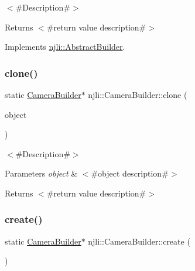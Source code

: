 $<$\#\+Description\#$>$

\begin{DoxyReturn}{Returns}
$<$\#return value description\#$>$ 
\end{DoxyReturn}


Implements \mbox{\hyperlink{classnjli_1_1_abstract_builder_aa1d220053e182c37b31b427499c6eacf}{njli\+::\+Abstract\+Builder}}.

\mbox{\label{classnjli_1_1_camera_builder_a54a9769ec9ff8dff4b69b4f32c9f22f8}} 
\subsubsection{\texorpdfstring{clone()}{clone()}}
{\footnotesize\ttfamily static \mbox{\hyperlink{classnjli_1_1_camera_builder}{Camera\+Builder}}$\ast$ njli\+::\+Camera\+Builder\+::clone (\begin{DoxyParamCaption}\item[{const \mbox{\hyperlink{classnjli_1_1_camera_builder}{Camera\+Builder}} \&}]{object }\end{DoxyParamCaption})\hspace{0.3cm}{\ttfamily [static]}}

$<$\#\+Description\#$>$


\begin{DoxyParams}{Parameters}
{\em object} & $<$\#object description\#$>$\\
\hline
\end{DoxyParams}
\begin{DoxyReturn}{Returns}
$<$\#return value description\#$>$ 
\end{DoxyReturn}
\mbox{\label{classnjli_1_1_camera_builder_abdd01724b7aa8ecf4013d9ec6ee8f30d}} 
\subsubsection{\texorpdfstring{create()}{create()}}
{\footnotesize\ttfamily static \mbox{\hyperlink{classnjli_1_1_camera_builder}{Camera\+Builder}}$\ast$ njli\+::\+Camera\+Builder\+::create (\begin{DoxyParamCaption}{ }\end{DoxyParamCaption})\hspace{0.3cm}{\ttfamily [static]}}

